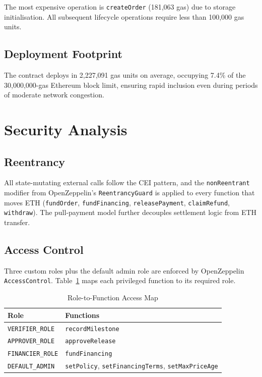 \documentclass[conference]{IEEEtran}
\begin{document}
The most expensive operation is \texttt{createOrder} (181,063 gas)
due to storage initialisation.
All subsequent lifecycle operations require less than 100,000 gas units.

\subsection{Deployment Footprint}

The contract deploys in 2,227,091 gas units on average, occupying 7.4\%
of the 30,000,000-gas Ethereum block limit, ensuring rapid inclusion
even during periods of moderate network congestion.

\section{Security Analysis}
\label{sec:security}

\subsection{Reentrancy}

All state-mutating external calls follow the CEI pattern, and the
\texttt{nonReentrant} modifier from OpenZeppelin's
\texttt{ReentrancyGuard} is applied to every function that
moves ETH (\texttt{fundOrder}, \texttt{fundFinancing},
\texttt{releasePayment}, \texttt{claimRefund}, \texttt{withdraw}).
The pull-payment model further decouples settlement logic from
ETH transfer.

\subsection{Access Control}

Three custom roles plus the default admin role are enforced by
OpenZeppelin \texttt{AccessControl}.
Table~\ref{tab:rbac} maps each privileged function to its required role.

\begin{table}[htbp]
  \caption{Role-to-Function Access Map}
  \label{tab:rbac}
  \centering
  \small
  \renewcommand{\arraystretch}{1.12}
  \begin{tabular}{lp{4.2cm}}
    \toprule
    \textbf{Role} & \textbf{Functions} \\
    \midrule
    \texttt{VERIFIER\_ROLE}  & \texttt{recordMilestone} \\
    \texttt{APPROVER\_ROLE}  & \texttt{approveRelease} \\
    \texttt{FINANCIER\_ROLE} & \texttt{fundFinancing} \\
    \texttt{DEFAULT\_ADMIN}  & \texttt{setPolicy}, \texttt{setFinancingTerms}, \newline \texttt{setMaxPriceAge} \\
    \bottomrule
  \end{tabular}
\end{table}
\end{document}
